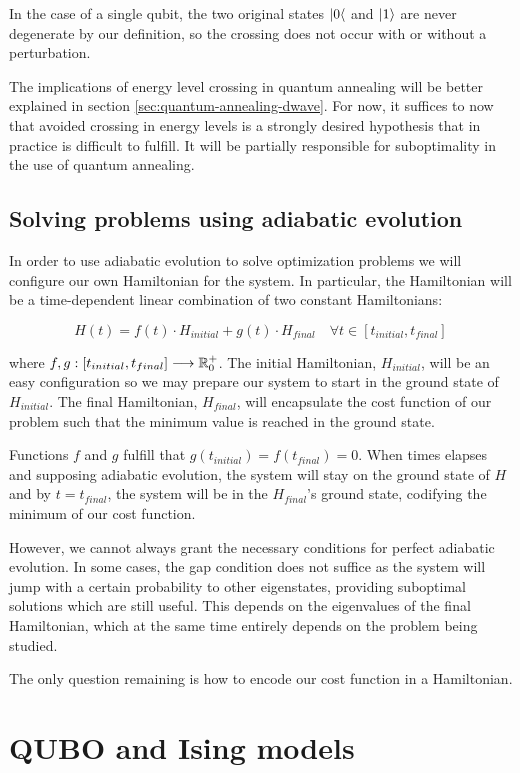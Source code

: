 In the case of a single qubit, the two original states $|0\langle$ and $|1\rangle$ are never degenerate by our definition, so the crossing does not occur with or without a perturbation.

The implications of energy level crossing in quantum annealing will be better explained in section \ref{sec:quantum-annealing-dwave}. For now, it suffices to now that avoided crossing in energy levels is a strongly desired hypothesis that in practice is difficult to fulfill. It will be partially responsible for suboptimality in the use of quantum annealing.


\subsection{Solving problems using adiabatic evolution}


In order to use adiabatic evolution to solve optimization problems we will configure our own Hamiltonian for the system. In particular, the Hamiltonian will be a time-dependent linear combination of two constant Hamiltonians:

$$ H(t) = f(t) \cdot H_{initial} + g(t) \cdot H_{final} \quad \forall t \in [t_{initial}, t_{final}] $$

where $f,g: [t_{initial}, t_{final}] \longrightarrow \mathbb{R}^+_0$. The initial Hamiltonian, $H_{initial}$, will be an easy configuration so we may prepare our system to start in the ground state of $H_{initial}$. The final Hamiltonian, $H_{final}$, will encapsulate the cost function of our problem such that the minimum value is reached in the ground state. 

Functions $f$ and $g$ fulfill that $g(t_{initial}) = f(t_{final}) = 0$. When times elapses and supposing adiabatic evolution, the system will stay on the ground state of $H$ and by $t = t_{final}$, the system will be in the $H_{final}$'s ground state, codifying the minimum of our cost function.

However, we cannot always grant the necessary conditions for perfect adiabatic evolution. In some cases, the gap condition does not suffice as the system will jump with a certain probability to other eigenstates, providing suboptimal solutions which are still useful. This depends on the eigenvalues of the final Hamiltonian, which at the same time entirely depends on the problem being studied.

The only question remaining is how to encode our cost function in a Hamiltonian.


\section{QUBO and Ising models}


